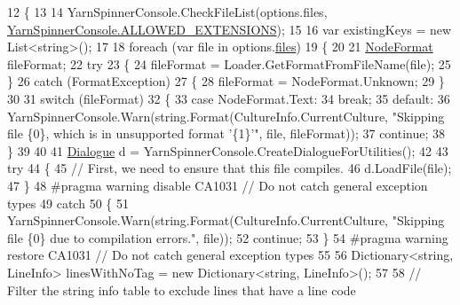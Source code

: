 \begin{DoxyCode}
12         \{
13 
14             YarnSpinnerConsole.CheckFileList(options.files, 
      \hyperlink{a00172_a0979de7ea02c8c0375b8220a12e6575e}{YarnSpinnerConsole.ALLOWED\_EXTENSIONS});
15 
16             var existingKeys = \textcolor{keyword}{new} List<string>();
17 
18             \textcolor{keywordflow}{foreach} (var file \textcolor{keywordflow}{in} options.\hyperlink{a00040_aa93cbb1bc1d5328e0a417012621e92d2}{files})
19             \{
20 
21                 \hyperlink{a00048_ad7ebb46e7309ead8767383a672b3272f}{NodeFormat} fileFormat;
22                 \textcolor{keywordflow}{try}
23                 \{
24                     fileFormat = Loader.GetFormatFromFileName(file);
25                 \}
26                 \textcolor{keywordflow}{catch} (FormatException)
27                 \{
28                     fileFormat = NodeFormat.Unknown;
29                 \}
30 
31                 \textcolor{keywordflow}{switch} (fileFormat)
32                 \{
33                     \textcolor{keywordflow}{case} NodeFormat.Text:
34                         \textcolor{keywordflow}{break};
35                     \textcolor{keywordflow}{default}:
36                         YarnSpinnerConsole.Warn(string.Format(CultureInfo.CurrentCulture, \textcolor{stringliteral}{"Skipping file
       \{0\}, which is in unsupported format '\{1\}'"}, file, fileFormat));
37                         \textcolor{keywordflow}{continue};
38                 \}
39 
40 
41                 \hyperlink{a00088}{Dialogue} d = YarnSpinnerConsole.CreateDialogueForUtilities();
42 
43                 \textcolor{keywordflow}{try}
44                 \{
45                     \textcolor{comment}{// First, we need to ensure that this file compiles.}
46                     d.LoadFile(file);
47                 \}
48 \textcolor{preprocessor}{#pragma warning disable CA1031 // Do not catch general exception types}
49 \textcolor{preprocessor}{}                \textcolor{keywordflow}{catch}
50                 \{
51                     YarnSpinnerConsole.Warn(string.Format(CultureInfo.CurrentCulture, \textcolor{stringliteral}{"Skipping file \{0\}
       due to compilation errors."}, file));
52                     \textcolor{keywordflow}{continue};
53                 \}
54 \textcolor{preprocessor}{#pragma warning restore CA1031 // Do not catch general exception types}
55 \textcolor{preprocessor}{}
56                 Dictionary<string, LineInfo> linesWithNoTag = \textcolor{keyword}{new} Dictionary<string, LineInfo>();
57 
58                 \textcolor{comment}{// Filter the string info table to exclude lines that have a line code}

\end{DoxyCode}
